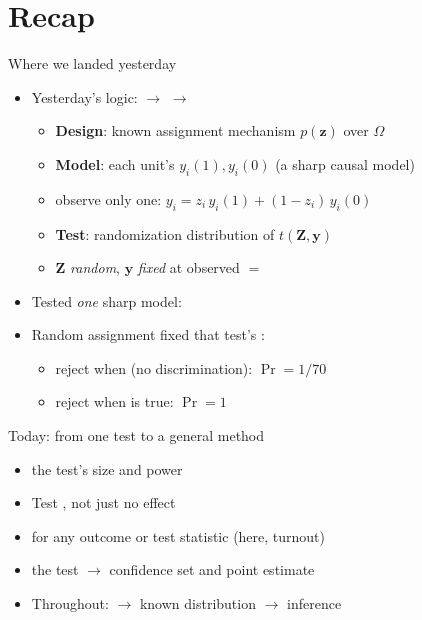 \documentclass[table, xcolor = {dvipsnames}, 9pt]{beamer}
\theoremstyle{plain}
\newcommand{\mh}[1]{{\color{magenta}{#1}}}
\begin{document}
\section{Recap}
\begin{frame}[t]{Where we landed yesterday}
\vfill
\begin{itemize} \vfill
\item Yesterday's logic: \mh{design} $\to$ \mh{model} $\to$ \mh{test} \vfill
\begin{itemize} \vfill
\item \textbf{Design}: known assignment mechanism $p(\bm{z})$ over $\Omega$ \vfill
\item \textbf{Model}: each unit's \mh{potential outcomes} $y_i(1), y_i(0)$ (a sharp causal model) \vfill
\item[] observe only one: $y_i = z_i\,y_i(1) + (1 - z_i)\,y_i(0)$ \vfill
\item \textbf{Test}: randomization distribution of $t(\bm{Z}, \bm{y})$ \vfill
\item[] $\bm{Z}$ \emph{random}, $\bm{y}$ \emph{fixed} at observed $=$ \mh{sharp null of no effect} \vfill
\end{itemize} \vfill
\item Tested \emph{one} sharp model: \mh{no discrimination} \vfill
\item Random assignment fixed that test's \mh{error probabilities}: \vfill
\begin{itemize} \vfill
\item reject when \mh{true} (no discrimination): $\Pr = 1/70$ \vfill
\item reject when \mh{perfect discrimination} is true: $\Pr = 1$ \vfill
\end{itemize} \vfill
\end{itemize} \vfill
\end{frame}
\begin{frame}[t]{Today: from one test to a general method}
\vfill
\begin{itemize} \vfill
\item \mh{Quantify} the test's size and power \vfill
\item Test \mh{any constant-effect null}, not just no effect \vfill
\item \mh{Same procedure} for any outcome or test statistic (here, turnout) \vfill
\item \mh{Invert} the test $\to$ confidence set and point estimate \vfill
\item Throughout: \mh{random assignment} $\to$ known distribution $\to$ inference \vfill
\end{itemize} \vfill
\end{frame}
\end{document}
